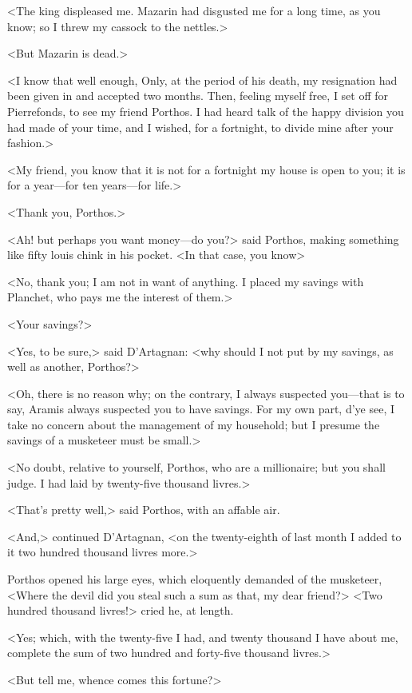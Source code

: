 <The king displeased me. Mazarin had disgusted me for a long time, as you know; so I threw my cassock to the nettles.>

<But Mazarin is dead.>

<I know that well enough,  Only, at the period of his death, my resignation had been given in and accepted two months. Then, feeling myself free, I set off for Pierrefonds, to see my friend Porthos. I had heard talk of the happy division you had made of your time, and I wished, for a fortnight, to divide mine after your fashion.>

<My friend, you know that it is not for a fortnight my house is open to you; it is for a year—for ten years—for life.>

<Thank you, Porthos.>

<Ah! but perhaps you want money—do you?> said Porthos, making something like fifty louis chink in his pocket. <In that case, you know\longdash>

<No, thank you; I am not in want of anything. I placed my savings with Planchet, who pays me the interest of them.>

<Your savings?>

<Yes, to be sure,> said D'Artagnan: <why should I not put by my savings, as well as another, Porthos?>

<Oh, there is no reason why; on the contrary, I always suspected you—that is to say, Aramis always suspected you to have savings. For my own part, d'ye see, I take no concern about the management of my household; but I presume the savings of a musketeer must be small.>

<No doubt, relative to yourself, Porthos, who are a millionaire; but you shall judge. I had laid by twenty-five thousand livres.>

<That's pretty well,> said Porthos, with an affable air.

<And,> continued D'Artagnan, <on the twenty-eighth of last month I added to it two hundred thousand livres more.>

Porthos opened his large eyes, which eloquently demanded of the musketeer, <Where the devil did you steal such a sum as that, my dear friend?> <Two hundred thousand livres!> cried he, at length.

<Yes; which, with the twenty-five I had, and twenty thousand I have about me, complete the sum of two hundred and forty-five thousand livres.>

<But tell me, whence comes this fortune?>

